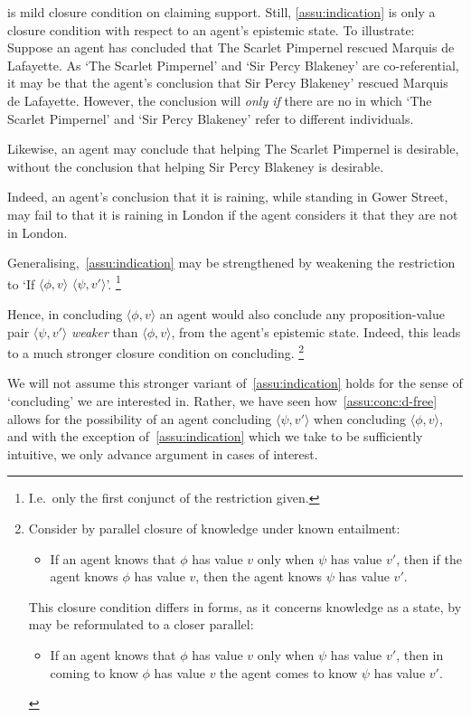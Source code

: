 \begin{note}
   is mild closure condition on claiming support.
  Still, \autoref{assu:indication} is only a closure condition with respect to an agent's epistemic state.
  To illustrate:
  Suppose an agent has concluded that The Scarlet Pimpernel rescued Marquis de Lafayette.
  As `The Scarlet Pimpernel' and `Sir Percy Blakeney' are co-referential, it may be that the agent's conclusion  that Sir Percy Blakeney' rescued Marquis de Lafayette.
  However, the conclusion will  \emph{only if} there are no  in which `The Scarlet Pimpernel' and `Sir Percy Blakeney' refer to different individuals.

  Likewise, an agent may conclude that helping The Scarlet Pimpernel is desirable, without the conclusion \indicatePr{} that helping Sir Percy Blakeney is desirable.

  Indeed, an agent's conclusion that it is raining, while standing in Gower Street, may fail to \indicateN{} that it is raining in London if the agent considers it \epPAd{} that they are not in London.
\end{note}

\begin{note}
  Generalising,~\autoref{assu:indication} may be strengthened by weakening the restriction to `If \(\langle \phi,v \rangle\)  \(\langle \psi,v' \rangle\)'.%
  \footnote{
    I.e.\ only the first conjunct of the restriction given.
  }

  Hence, in concluding \(\langle \phi,v \rangle\) an agent would also conclude any proposition-value pair \(\langle \psi,v' \rangle\) \emph{weaker} than \(\langle \phi,v \rangle\), from the agent's epistemic state.
  Indeed, this leads to a much stronger closure condition on concluding.%
  \footnote{
    Consider by parallel closure of knowledge under known entailment:
    \begin{itemize}
    \item If an agent knows that \(\phi\) has value \(v\) only when \(\psi\) has value \(v'\), then if the agent knows \(\phi\) has value \(v\), then the agent knows \(\psi\) has value \(v'\).
    \end{itemize}
    This closure condition differs in forms, as it concerns knowledge as a state, by may be reformulated to a closer parallel:
        \begin{itemize}
    \item If an agent knows that \(\phi\) has value \(v\) only when \(\psi\) has value \(v'\), then in coming to know \(\phi\) has value \(v\) the agent comes to know \(\psi\) has value \(v'\).
    \end{itemize}
  }

  We will not assume this stronger variant of~\autoref{assu:indication} holds for the sense of `concluding' we are interested in.
  Rather, we have seen how~\autoref{assu:conc:d-free} allows for the possibility of an agent concluding \(\langle \psi,v' \rangle\) when concluding \(\langle \phi,v \rangle\), and with the exception of~\autoref{assu:indication} which we take to be sufficiently intuitive, we only advance argument in cases of interest.
\end{note}

